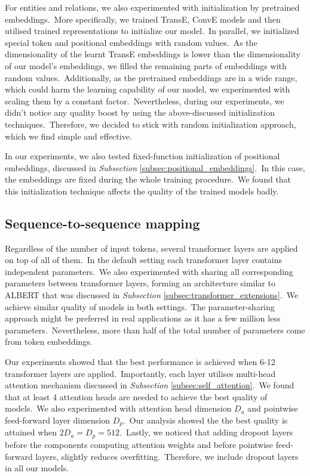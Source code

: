 \documentclass[longabstract, english, mgr]{iithesis}
\theoremstyle{default_theorem_style}\newtheorem{theorem}{Theorem}
\theoremstyle{default_theorem_style}\newtheorem{definition}{Definition}
\begin{document}
\noindent For entities and relations, we also experimented with initialization by pretrained embeddings.\ More
specifically, we trained TransE, ConvE models and then utilised trained representations to initialize our model.\ In
parallel, we initialized special token and positional embeddings with random values.\ As
the dimensionality of the learnt TransE embeddings is lower than the dimensionality of our model's embeddings, we
filled the remaining parts of embeddings with random values.\ Additionally, as the pretrained embeddings are in a wide
range, which could harm the learning capability of our model, we experimented with scaling them by a constant
factor.\ Nevertheless, during our experiments, we didn't notice any quality boost by using the above-discussed
initialization techniques.\ Therefore, we decided to stick with random initialization approach, which we find simple
and effective.\newline

\noindent In our experiments, we also tested fixed-function initialization of positional embeddings, discussed in
\textit{Subsection} \ref{subsec:positional_embeddings}.\ In this case, the embeddings are fixed during the whole
training procedure.\ We found that this initialization technique affects the quality of the trained models badly.


\subsection{Sequence-to-sequence mapping}\label{subsec:sequence_to_sequence_mapping}

Regardless of the number of input tokens, several transformer layers are applied on top of all of them.\ In the
default setting each transformer layer contains independent parameters.\ We also experimented with sharing all
corresponding parameters between transformer layers, forming an architecture similar to ALBERT that was discussed
in \textit{Subsection} \ref{subsec:transformer_extensions}.\ We achieve similar quality of models in both
settings.\ The parameter-sharing approach might be preferred in real applications as it has a few million less
parameters.\ Nevertheless, more than half of the total number of parameters come from token embeddings.\newline

\noindent Our experiments showed that the best performance is achieved when 6-12 transformer layers are
applied.\ Importantly, each layer utilises multi-head attention mechanism discussed in \textit{Subsection}
\ref{subsec:self_attention}.\ We found that at least 4 attention heads are needed to achieve the best
quality of models.\ We also experimented with attention head dimension $D_a$ and pointwise feed-forward layer
dimension $D_p$.\ Our analysis showed the the best quality is attained when $2 D_a = D_p = 512$.\ Lastly, we noticed
that adding dropout layers before the components computing attention weights and before pointwise feed-forward layers,
slightly reduces overfitting.\ Therefore, we include dropout layers in all our models.
\end{document}
